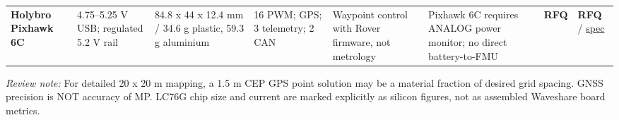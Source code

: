 \documentclass[10pt,a4paper]{article}
\begin{document}
\begin{landscape}
\begin{longtable}{@{}L{33.6mm}L{23.8mm}L{27.1mm}L{36.1mm}L{36.9mm}L{36.9mm}L{14.8mm}L{28.7mm}@{}}
\textbf{Holybro Pixhawk 6C} & 4.75--5.25 V USB; regulated 5.2 V rail & 84.8 x 44 x 12.4 mm / 34.6 g plastic, 59.3 g aluminium & 16 PWM; GPS; 3 telemetry; 2 CAN & Waypoint control with Rover firmware, not metrology & Pixhawk 6C requires ANALOG power monitor; no direct battery-to-FMU & \textbf{RFQ} & \textbf{RFQ} / \href{https://docs.holybro.com/autopilot/pixhawk-6c/technical-specification}{spec} \\
\end{longtable}
\textit{Review note:} For detailed 20 x 20 m mapping, a 1.5 m CEP GPS point solution may be a material fraction of desired grid spacing. GNSS precision is NOT accuracy of MP. LC76G chip size and current are marked explicitly as silicon figures, not as assembled Waveshare board metrics.
\end{landscape}
\end{document}
